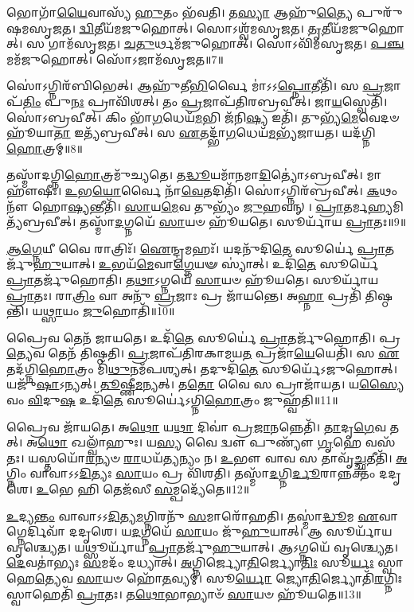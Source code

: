 𑌭𑍋𑌗𑌾᳴\-\ul{𑌯𑍈}\-𑌵𑌾𑌸𑍍𑌯᳴ \ul{𑌹𑍁}\-𑌤𑌂 𑌭᳴𑌵𑌤𑌿।
𑌤\-\ul{𑌸𑍍𑌯𑌾} 𑌆𑌹𑍁᳴\-\ul{𑌤𑍍𑌯𑍈} 𑌪𑍁𑌰𑍁᳴𑌷𑌮\-𑌸𑍃𑌜𑌤।
\-\ul{𑌦𑍍𑌵𑌿}\-𑌤𑍀𑌯᳴𑌮𑌜𑍁𑌹𑍋𑌤𑍍।
𑌸𑍋𑌽𑌶𑍍𑌵᳴𑌮\-𑌸𑍃𑌜𑌤।
\-\ul{𑌤𑍃}\-𑌤𑍀𑌯᳴𑌮𑌜𑍁𑌹𑍋𑌤𑍍।
𑌸 𑌗𑌾𑌮᳴\-𑌸𑍃𑌜𑌤।
\-\ul{𑌚}\-\-\ul{𑌤𑍁}\-𑌰𑍍𑌥𑌮᳴𑌜𑍁𑌹𑍋𑌤𑍍।
𑌸𑍋𑌽𑌵𑌿᳴𑌮\-𑌸𑍃𑌜𑌤।
\-\ul{𑌪}\-\-\ul{𑌞𑍍𑌚}\-𑌮𑌮᳴𑌜𑍁𑌹𑍋𑌤𑍍।
𑌸𑍋᳴𑌽𑌜𑌾𑌮᳴\-𑌸𑍃𑌜𑌤॥7॥

𑌸𑍋॑𑌽𑌗𑍍𑌨𑌿𑌰᳴𑌬𑌿𑌭𑍇𑌤𑍍।
𑌆𑌹𑍁᳴𑌤𑍀\-\ul{𑌭𑌿}\-𑌰𑍍𑌵𑍈 𑌮𑌾॑\-𑌽𑌽\-\ul{𑌪𑍍𑌨𑍋}\-𑌤𑍀𑌤𑌿᳴।
𑌸 \ul{𑌪𑍍𑌰}\-𑌜𑌾𑌪᳴\-\ul{𑌤𑌿𑌂} 𑌪𑍁\-\ul{𑌨𑌃} 𑌪𑍍𑌰𑌾𑌵𑌿᳴𑌶𑌤𑍍।
𑌤𑌂 \ul{𑌪𑍍𑌰}\-𑌜𑌾𑌪᳴𑌤𑌿𑌰𑌬𑍍𑌰𑌵𑍀𑌤𑍍।
𑌜𑌾\-\ul{𑌯}\-𑌸𑍍𑌵𑍇𑌤𑌿᳴।
𑌸𑍋॑𑌽𑌬𑍍𑌰𑌵𑍀𑌤𑍍।
𑌕𑌿𑌂 𑌭𑌾᳴\-\ul{𑌗}\-𑌧𑍇𑌯᳴\-\ul{𑌮}\-𑌭𑌿 𑌜᳴𑌨𑌿\-\ul{𑌷𑍍𑌯} 𑌇𑌤𑌿᳴।
𑌤𑍁𑌭𑍍𑌯᳴\-\ul{𑌮𑍇}\-𑌵𑍇𑌦𑍞 𑌹𑍂᳴𑌯𑌾\-\ul{𑌤𑌾} 𑌇𑌤𑍍𑌯᳴𑌬𑍍𑌰𑌵𑍀𑌤𑍍।
𑌸 \ul{𑌏}\-𑌤𑌦𑍍𑌭𑌾᳴\-\ul{𑌗}\-𑌧𑍇𑌯᳴\-\ul{𑌮}\-𑌭𑍍𑌯᳴𑌜𑌾𑌯𑌤।
𑌯𑌦᳴𑌗𑍍𑌨𑌿\-\ul{𑌹𑍋}\-𑌤𑍍𑌰𑌮𑍍॥8॥

𑌤𑌸𑍍𑌮𑌾᳴𑌦𑌗𑍍𑌨𑌿\-\ul{𑌹𑍋}\-𑌤𑍍𑌰𑌮𑍁᳴𑌚𑍍𑌯𑌤𑍇।
𑌤\-\ul{𑌦𑍍𑌧𑍂}\-𑌯𑌮𑌾᳴𑌨𑌮𑌾\-\ul{𑌦𑌿}\-𑌤𑍍𑌯𑍋॑\-𑌽𑌬𑍍𑌰𑌵𑍀𑌤𑍍।
𑌮𑌾 𑌹𑍗᳴𑌷𑍀𑌃।
\-\ul{𑌉}\-𑌭\-\ul{𑌯𑍋}\-𑌰𑍍𑌵𑍈 𑌨𑌾᳴\-\ul{𑌵𑍇}\-𑌤𑌦𑌿𑌤𑌿᳴।
𑌸𑍋॑𑌽𑌗𑍍𑌨𑌿𑌰᳴𑌬𑍍𑌰𑌵𑍀𑌤𑍍।
\-\ul{𑌕}\-𑌥𑌂 𑌨𑍗᳴ 𑌹𑍋\-\ul{𑌷𑍍𑌯}\-𑌨𑍍𑌤𑍀𑌤𑌿᳴।
\-\ul{𑌸𑌾}\-𑌯\-\ul{𑌮𑍇}\-𑌵 𑌤𑍁𑌭𑍍𑌯𑌂᳴ \ul{𑌜𑍁}\-𑌹𑌵𑌨𑍍।
\-\ul{𑌪𑍍𑌰𑌾}\-𑌤𑌰𑍍𑌮\-\ul{𑌹𑍍𑌯}\-𑌮𑌿𑌤𑍍𑌯᳴𑌬𑍍𑌰𑌵𑍀𑌤𑍍।
𑌤𑌸𑍍𑌮𑌾᳴\-\ul{𑌦}\-𑌗𑍍𑌨𑌯𑍇᳴ \ul{𑌸𑌾}\-𑌯𑍞 𑌹𑍂᳴𑌯𑌤𑍇।
𑌸𑍂𑌰𑍍𑌯𑌾᳴𑌯 \ul{𑌪𑍍𑌰𑌾}\-𑌤𑌃॥9॥

\-\ul{𑌆}\-\-\ul{𑌗𑍍𑌨𑍇}\-𑌯𑍀 𑌵𑍈 𑌰𑌾𑌤𑍍𑌰𑌿𑌃᳴।
\-\ul{𑌐}\-𑌨𑍍𑌦𑍍𑌰𑌮𑌹𑌃᳴।
𑌯𑌦𑌨𑍁᳴𑌦𑌿\-\ul{𑌤𑍇} 𑌸𑍂𑌰𑍍𑌯𑍇॑ \ul{𑌪𑍍𑌰𑌾}\-𑌤𑌰𑍍𑌜𑍁᳴\-\ul{𑌹𑍁}\-𑌯𑌾𑌤𑍍।
\-\ul{𑌉}\-𑌭𑌯᳴\-\ul{𑌮𑍇}\-𑌵𑌾\-\ul{𑌗𑍍𑌨𑍇}\-𑌯𑍟 𑌸𑍍𑌯𑌾॑𑌤𑍍।
𑌉𑌦𑌿᳴\-\ul{𑌤𑍇} 𑌸𑍂𑌰𑍍𑌯𑍇॑ \ul{𑌪𑍍𑌰𑌾}\-𑌤𑌰𑍍𑌜𑍁᳴𑌹𑍋𑌤𑌿।
𑌤\-\ul{𑌥𑌾}\-𑌽𑌗𑍍𑌨𑌯𑍇᳴ \ul{𑌸𑌾}\-𑌯𑍞 𑌹𑍂᳴𑌯𑌤𑍇।
𑌸𑍂𑌰𑍍𑌯𑌾᳴𑌯 \ul{𑌪𑍍𑌰𑌾}\-𑌤𑌃।
𑌰𑌾\-\ul{𑌤𑍍𑌰𑌿𑌂} 𑌵𑌾 𑌅𑌨𑍁᳴ \ul{𑌪𑍍𑌰}\-𑌜𑌾𑌃 𑌪𑍍𑌰 𑌜𑌾᳴𑌯𑌨𑍍𑌤𑍇।
𑌅\-\ul{𑌹𑍍𑌨𑌾} 𑌪𑍍𑌰𑌤𑌿᳴ 𑌤𑌿𑌷𑍍𑌠𑌨𑍍𑌤𑌿।
𑌯\-\ul{𑌥𑍍𑌸𑌾}\-𑌯𑌂 \ul{𑌜𑍁}\-𑌹𑍋𑌤𑌿᳴॥10॥

𑌪𑍍𑌰𑍈𑌵 𑌤𑍇𑌨᳴ 𑌜𑌾𑌯𑌤𑍇।
𑌉𑌦𑌿᳴\-\ul{𑌤𑍇} 𑌸𑍂𑌰𑍍𑌯𑍇॑ \ul{𑌪𑍍𑌰𑌾}\-𑌤𑌰𑍍𑌜𑍁᳴𑌹𑍋𑌤𑌿।
𑌪𑍍𑌰\-\ul{𑌤𑍍𑌯𑍇}\-𑌵 𑌤𑍇𑌨᳴ 𑌤𑌿𑌷𑍍𑌠𑌤𑌿।
\-\ul{𑌪𑍍𑌰}\-𑌜𑌾𑌪᳴𑌤𑌿𑌰𑌕𑌾𑌮𑌯\-\ul{𑌤} 𑌪𑍍𑌰𑌜𑌾᳴\-\ul{𑌯𑍇}\-𑌯𑍇𑌤𑌿᳴।
𑌸 \ul{𑌏}\-𑌤𑌦᳴𑌗𑍍𑌨𑌿\-\ul{𑌹𑍋}\-𑌤𑍍𑌰𑌂 𑌮𑌿᳴\-\ul{𑌥𑍁}\-𑌨𑌮᳴𑌪𑌶𑍍𑌯𑌤𑍍।
𑌤𑌦𑍁𑌦𑌿᳴\-\ul{𑌤𑍇} 𑌸𑍂𑌰𑍍𑌯𑍇᳴\-𑌽𑌜𑍁𑌹𑍋𑌤𑍍।
𑌯𑌜𑍁᳴\-\ul{𑌷𑌾}\-\-𑌽𑌨𑍍𑌯𑌤𑍍।
\-\ul{𑌤𑍂}\-𑌷𑍍𑌣𑍀\-\ul{𑌮}\-𑌨𑍍𑌯𑌤𑍍।
𑌤\-\ul{𑌤𑍋} 𑌵𑍈 𑌸 𑌪𑍍𑌰𑌾𑌜𑌾᳴𑌯𑌤।
𑌯\-\ul{𑌸𑍍𑌯𑍈}\-𑌵𑌂 \ul{𑌵𑌿}\-𑌦𑍁\-\ul{𑌷} 𑌉𑌦𑌿᳴\-\ul{𑌤𑍇} 𑌸𑍂𑌰𑍍𑌯𑍇॑\-𑌽𑌗𑍍𑌨𑌿\-\ul{𑌹𑍋}\-𑌤𑍍𑌰𑌂 𑌜𑍁𑌹𑍍𑌵᳴𑌤𑌿॥11॥

𑌪𑍍𑌰𑍈𑌵 𑌜𑌾᳴𑌯𑌤𑍇।
𑌅\-\ul{𑌥𑍋} 𑌯\-\ul{𑌥𑌾} 𑌦𑌿𑌵𑌾॑ 𑌪𑍍𑌰\-\ul{𑌜𑌾}\-𑌨𑌨𑍍𑌨𑍇𑌤𑌿᳴।
\-\ul{𑌤𑌾}\-𑌦𑍃\-\ul{𑌗𑍇}\-𑌵 𑌤𑌤𑍍।
𑌅\-\ul{𑌥𑍋} 𑌖𑌲𑍍𑌵𑌾᳴𑌹𑍁𑌃।
𑌯\-\ul{𑌸𑍍𑌯} 𑌵𑍈 𑌦𑍍𑌵𑍗 𑌪𑍁𑌣𑍍𑌯𑍗᳴ \ul{𑌗𑍃}\-𑌹𑍇 𑌵𑌸᳴𑌤𑌃।
𑌯𑌸𑍍𑌤𑌯𑍋᳴\-\ul{𑌰}\-𑌨𑍍𑌯𑍞 \ul{𑌰𑌾}\-𑌧𑌯᳴\-\ul{𑌤𑍍𑌯}\-𑌨𑍍𑌯𑌂 𑌨।
\-\ul{𑌉}\-𑌭𑍗 𑌵𑌾𑌵 𑌸 𑌤𑌾𑌵𑍃᳴\-\ul{𑌚𑍍𑌛}\-𑌤𑍀𑌤𑌿᳴।
\-\ul{𑌅}\-𑌗𑍍𑌨𑌿𑌂 𑌵𑌾𑌵𑌾\-𑌽𑌽\-\ul{𑌦𑌿}\-𑌤𑍍𑌯𑌃 \ul{𑌸𑌾}\-𑌯𑌂 𑌪𑍍𑌰 𑌵𑌿᳴𑌶𑌤𑌿।
𑌤𑌸𑍍𑌮𑌾᳴\-\ul{𑌦}\-𑌗𑍍𑌨𑌿\-\ul{𑌰𑍍𑌦𑍂}\-𑌰𑌾𑌨𑍍𑌨𑌕𑍍𑌤𑌂᳴ 𑌦𑌦𑍃𑌶𑍇।
\-\ul{𑌉}\-𑌭𑍇 𑌹𑌿 𑌤𑍇𑌜᳴𑌸𑍀 \ul{𑌸}\-𑌮𑍍𑌪𑌦𑍍𑌯𑍇᳴𑌤𑍇॥12॥

\-\ul{𑌉}\-𑌦𑍍𑌯\-\ul{𑌨𑍍𑌤𑌂} 𑌵𑌾𑌵𑌾\-𑌽𑌽\-\ul{𑌦𑌿}\-𑌤𑍍𑌯\-\ul{𑌮}\-𑌗𑍍𑌨𑌿𑌰𑌨𑍁᳴ \ul{𑌸}\-𑌮𑌾𑌰𑍋᳴𑌹𑌤𑌿।
𑌤𑌸𑍍𑌮𑌾॑\-\ul{𑌦𑍍𑌧𑍂}\-𑌮 \ul{𑌏}\-𑌵𑌾𑌗𑍍𑌨𑍇𑌰𑍍𑌦𑌿𑌵𑌾᳴ 𑌦𑌦𑍃𑌶𑍇।
𑌯\-\ul{𑌦}\-𑌗𑍍𑌨𑌯𑍇᳴ \ul{𑌸𑌾}\-𑌯𑌂 𑌜𑍁᳴\-\ul{𑌹𑍁}\-𑌯𑌾𑌤𑍍।
𑌆 𑌸𑍂𑌰𑍍𑌯𑌾᳴𑌯 𑌵𑍃𑌶𑍍𑌚𑍍𑌯𑍇𑌤।
𑌯𑌥𑍍𑌸𑍂𑌰𑍍𑌯𑌾᳴𑌯 \ul{𑌪𑍍𑌰𑌾}\-𑌤𑌰𑍍𑌜𑍁᳴\-\ul{𑌹𑍁}\-𑌯𑌾𑌤𑍍।
𑌆𑌽𑌗𑍍𑌨𑌯𑍇᳴ 𑌵𑍃𑌶𑍍𑌚𑍍𑌯𑍇𑌤।
\-\ul{𑌦𑍇}\-𑌵𑌤𑌾॑𑌭𑍍𑌯𑌃 \ul{𑌸}\-𑌮𑌦𑌂᳴ 𑌦𑌧𑍍𑌯𑌾𑌤𑍍।
\-\ul{𑌅}\-𑌗𑍍𑌨𑌿𑌰𑍍𑌜𑍍𑌯𑍋\-\ul{𑌤𑌿}\-𑌰𑍍𑌜𑍍𑌯𑍋\-\ul{𑌤𑌿𑌃} 𑌸𑍂\-\ul{𑌰𑍍𑌯𑌃} 𑌸𑍍𑌵𑌾𑌹𑍇\-\ul{𑌤𑍍𑌯𑍇}\-𑌵 \ul{𑌸𑌾}\-𑌯𑍞 𑌹𑍋᳴\-\ul{𑌤}\-𑌵𑍍𑌯𑌮𑍍॑।
𑌸𑍂\-\ul{𑌰𑍍𑌯𑍋} 𑌜𑍍𑌯𑍋\-\ul{𑌤𑌿}\-𑌰𑍍𑌜𑍍𑌯𑍋𑌤𑌿᳴\-\ul{𑌰}\-𑌗𑍍𑌨𑌿𑌃 𑌸𑍍𑌵𑌾𑌹𑍇𑌤𑌿᳴ \ul{𑌪𑍍𑌰𑌾}\-𑌤𑌃।
𑌤\-\ul{𑌥𑍋}\-𑌭𑌾𑌭𑍍𑌯𑌾𑍞᳴ \ul{𑌸𑌾}\-𑌯𑍞 𑌹𑍂᳴𑌯𑌤𑍇॥13॥

